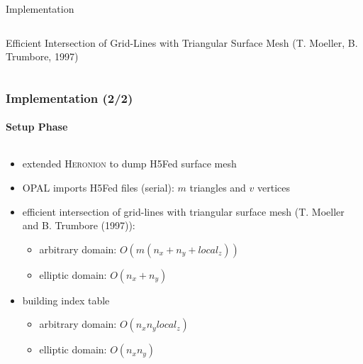 \documentclass[xcolor=pdftex,table,10pt]{beamer}
\newcommand{\opal}{\textsc{OPAL }}
\begin{document}
\begin{frame}{Implementation}
\begin{columns}
\begin{column}{5cm}
\begin{center}
            \vspace{0.2cm}

            Efficient Intersection of Grid-Lines with Triangular Surface Mesh (T. Moeller, B. Trumbore, 1997)
			\end{center}
		\end{column}
		\end{columns}

    \end{frame}
	
    \begin{frame}
        \frametitle{Implementation (2/2)}
        \framesubtitle{Setup Phase}

        \begin{columns}
        \begin{column}{6.6cm}
        \begin{itemize}
            \item extended \textsc{Heronion} to dump H5Fed surface mesh
            \item \opal imports H5Fed files (serial): $m$ triangles and $v$ vertices
            \item efficient intersection of grid-lines with triangular surface mesh (T. Moeller and B. Trumbore (1997)): 
                \begin{itemize}
                    \item arbitrary domain: $O(m(n_x+n_y+local_z))$ 
                    \item elliptic domain: $O(n_x + n_y)$
                \end{itemize}
            \item building index table
                \begin{itemize}
                    \item arbitrary domain: $O(n_x n_y local_z)$
                    \item elliptic domain: $O(n_x n_y)$
                \end{itemize}
        \end{itemize}
        \end{column}
        \begin{column}{4cm}	
            \begin{center}

\end{center}
\end{column}
\end{columns}
\end{frame}
\end{document}
